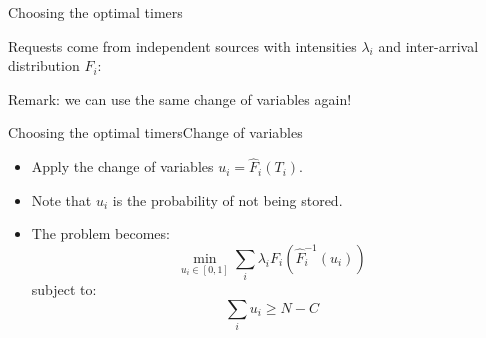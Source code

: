 \documentclass[aspectratio=169]{beamer}
\newenvironment*{myitem}[1][1.5em]{\begin{itemize}\setlength{\itemsep}{#1}}{\end{itemize}}
\begin{document}
\begin{frame}{Choosing the optimal timers}

	Requests come from independent sources with intensities $\lambda_i$ and inter-arrival distribution $F_i$:

	\vfill

	\vfill
	\pause
	\alert{Remark:} we can use the same change of variables again!
\end{frame}

\begin{frame}{Choosing the optimal timers}{Change of variables}
	
	\begin{myitem}[2em]
	\item Apply the change of variables $u_i = \hat{F}_i(T_i)$. 
	\item Note that $u_i$ is the probability of \alert{not being stored}. 
	
	\item The problem becomes:
	\begin{equation*}
		\min_{u_i \in [0,1]} \sum_i \lambda_i F_i(\hat{F}^{-1}_i(u_i))
	\end{equation*}
	subject to:
	\begin{equation*}
		\sum_i u_i \geqslant N-C
	\end{equation*}

	\end{myitem}

\end{frame}
\end{document}
